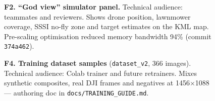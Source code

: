 \begin{figure}[h!]
\centering
\begin{minipage}[t]{0.48\textwidth}
  \centering
  \fbox{\rule{0pt}{4cm}\rule{\linewidth}{0pt}}
  \caption*{\footnotesize\textbf{F1. Web ground station} (\texttt{pi\_flight.py}). Technical audience: Robin during integration testing. Method: MJPEG stream + command buttons accessible from any browser on the field LAN. Evaluation: produced zero clarification questions on first use --- see §3.a.}
\end{minipage}\hfill
\begin{minipage}[t]{0.48\textwidth}
  \centering
  \fbox{\rule{0pt}{4cm}\rule{\linewidth}{0pt}}
  \caption*{\footnotesize\textbf{F2. ``God view'' simulator panel.} Technical audience: teammates and reviewers. Shows drone position, lawnmower coverage, SSSI no-fly zone and target estimates on the KML map. Pre-scaling optimisation reduced memory bandwidth 94\% (commit \texttt{374a462}).}
\end{minipage}
\end{figure}

\begin{figure}[h!]
\centering
\begin{minipage}[t]{0.48\textwidth}
  \centering
  \fbox{\rule{0pt}{4cm}\rule{\linewidth}{0pt}}
  \caption*{\footnotesize\textbf{F3. Interactive simulator} (\texttt{simple\_simulator.py}, 2508 lines). Mixed audience: myself (dev), teammates (demo). Keyboard-driven flight over satellite imagery, GPS drift and camera shake simulated. Used for every body claim in §1.b.}
\end{minipage}\hfill
\begin{minipage}[t]{0.48\textwidth}
  \centering
  \fbox{\rule{0pt}{4cm}\rule{\linewidth}{0pt}}
  \caption*{\footnotesize\textbf{F4. Training dataset samples} (\texttt{dataset\_v2}, 366 images). Technical audience: Colab trainer and future retrainers. Mixes synthetic composites, real DJI frames and negatives at 1456$\times$1088 --- authoring doc in \texttt{docs/TRAINING\_GUIDE.md}.}
\end{minipage}
\end{figure}

